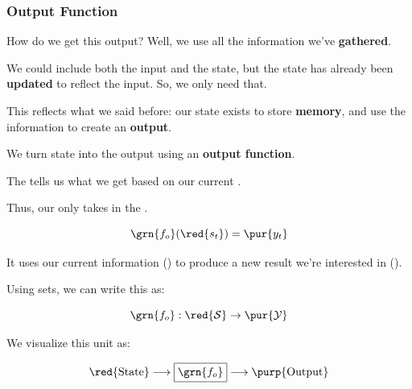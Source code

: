             
        \subsecdiv
        
        \subsubsection{Output Function}
        
            How do we get this output? Well, we use all the information we've \textbf{gathered}. 
            
            We could include both the input and the state, but the state has already been \textbf{updated} to reflect the input. So, we only need that.
            
            This reflects what we said before: our state exists to store \textbf{memory}, and use the information to create an \textbf{output}.
            
            We turn state into the output using an \textbf{output function}.\\
            
            \begin{definition}
                The   tells us what  we get based on our current .
                
                Thus, our  only takes in the . 
                
                \begin{equation*}
                    \grn{f_o}(\red{s_t}) = \pur{y_t}
                \end{equation*}
                
                It uses our current information () to produce a new result we're interested in ().
                
                Using sets, we can write this as:
                
                \begin{equation*}
                    \grn{f_o}: \red{\mathcal{S}} \rightarrow \pur{\mathcal{Y}}
                \end{equation*}
            \end{definition}
            
            We visualize this unit as:
            
            \begin{equation*}
                \text{\red{State}} 
                \longrightarrow \boxed{\grn{f_o}} \longrightarrow 
                \text{\purp{Output}}
            \end{equation*}
            
